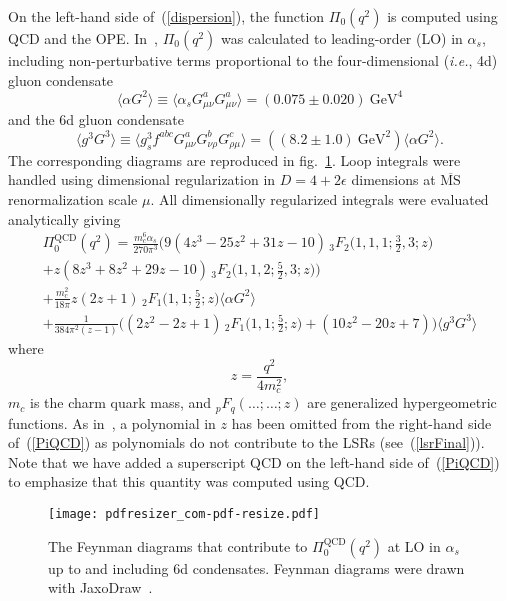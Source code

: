 \documentclass[12pt, letterpaper]{article}
\newcommand{\vev}[1]{\ensuremath{\langle #1\rangle}}
\newcommand{\aGG}{\vev{\alpha G^2}}
\newcommand{\gggGGG}{\vev{g^3 G^3}}
\newcommand{\gev}{\ensuremath{\text{GeV}}}
\newcommand{\ie}{\textit{i.e.}}
\begin{document}
On the left-hand side of~(\ref{dispersion}), the function $\Pi_0(q^2)$ is computed using QCD
and the OPE.
In~\cite{Govaerts:1985fx,Berg:2012gd}, $\Pi_0(q^2)$ was calculated to leading-order (LO) in $\alpha_s$,
including non-perturbative terms proportional to the
four-dimensional (\ie, 4d) gluon condensate~\cite{Launer:1983ib}
\begin{equation}\label{alphaGG}
  \aGG\equiv\vev{\alpha_s G^a_{\mu\nu}G^a_{\mu\nu}} =\left(0.075\pm 0.020\right)\ \gev^4
\end{equation}
and the 6d gluon condensate~\cite{Narison2010}
\begin{equation}\label{gluonSixD}
  \gggGGG\equiv\vev{g_s^3 f^{abc} G^a_{\mu\nu} G^b_{\nu\rho} G^c_{\rho\mu}}
  =\left(\left(8.2\pm 1.0\right)\ \gev^2\right)\aGG.
\end{equation}
The corresponding diagrams are reproduced in fig.~\ref{figureFeynmanDiagrams}.
Loop integrals were handled using dimensional regularization in $D=4+2\epsilon$ dimensions
at $\overline{\text{MS}}$ renormalization scale $\mu$.
All dimensionally regularized integrals were evaluated analytically
giving
\begin{multline}\label{PiQCD}
\Pi^{\text{QCD}}_0(q^2) 
= \frac{m_c^6 \alpha_s}{270\pi^3}
\Big(
  9(4z^3-25z^2+31z-10)\, {}_3 F_2\big(1,1,1;\tfrac{3}{2},3;z\big)\\
  +z(8z^3+8z^2+29z-10)\, {}_3 F_2\big(1,1,2;\tfrac{5}{2},3;z\big)
\Big)
\\
  + \frac{m_c^2}{18\pi}z(2z+1)\, {}_2 F_1\big(1,1;\tfrac{5}{2};z\big)\langle\alpha G^2 \rangle\\
  + \frac{1}{384\pi^2(z-1)}
\Big(
  (2z^2-2z+1)\, {}_2 F_1\big(1,1;\tfrac{5}{2};z\big)
  + (10z^2-20z+7)
\Big)
\langle g^3 G^3\rangle
\end{multline}
where
\begin{equation}
  z=\frac{q^2}{4m_c^2},
\end{equation}
$m_c$ is the charm quark mass, and ${}_p F_q(\ldots;\ldots;z)$ are generalized hypergeometric functions.  
As in~\cite{Berg:2012gd}, a polynomial in $z$ has been omitted from the right-hand side of~(\ref{PiQCD})
as polynomials do not contribute to the LSRs (see~(\ref{lsrFinal})).
Note that we have added a superscript $\text{QCD}$ on the left-hand side
of~(\ref{PiQCD}) to emphasize that this quantity was computed using QCD.

%
\begin{figure}[htbp]
\begin{center}
  \texttt{[image: pdfresizer\_com-pdf-resize.pdf]}
\end{center}
\caption{\label{figureFeynmanDiagrams} The Feynman diagrams that contribute to 
  $\Pi_0^{\text{QCD}}(q^2)$ at LO in $\alpha_s$ up to and including 6d 
  condensates.  
  Feynman diagrams were drawn with JaxoDraw~\cite{BinosiTheussl2004}.}
\end{figure}
%
\end{document}
